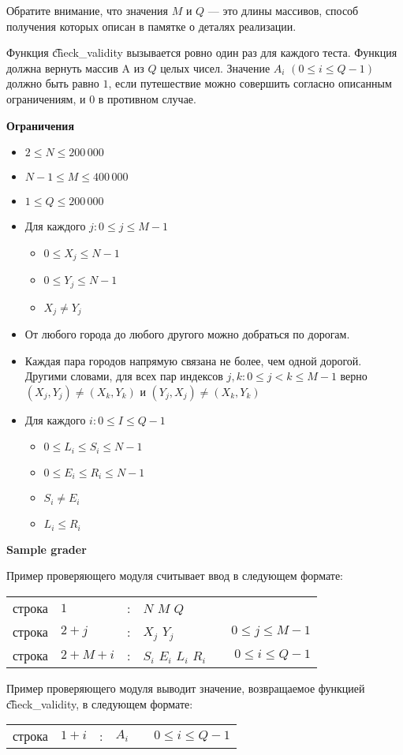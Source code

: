 Обратите внимание, что значения $M$ и $Q$ --- это длины массивов, способ получения которых описан в памятке о деталях реализации.

Функция \t{check_validity} вызывается ровно один раз для каждого теста. Функция должна вернуть массив A из $Q$ целых чисел. Значение $A_i$ $(0 \le i \le Q-1)$ должно быть равно $1$, если путешествие можно совершить согласно описанным ограничениям, и $0$ в противном случае.


\bf{Ограничения}

\begin{itemize}
\item $2 \le N \le 200\,000$
\item $N-1 \le M \le 400\,000$
\item $1 \le Q \le 200\,000$
\item Для каждого $j : 0 \le j \le M-1$
\begin{itemize}
\item $0 \le X_j \le N-1$
\item $0 \le Y_j \le N-1$
\item $X_j \neq Y_j$
\end{itemize}
\item От любого города до любого другого можно добраться по дорогам.
\item Каждая пара городов напрямую связана не более, чем одной дорогой. Другими словами, для всех пар индексов $j, k: 0 \le j < k \le M-1$ верно $(X_j, Y_j) \neq (X_k, Y_k)$ и $(Y_j, X_j) \neq (X_k, Y_k)$
\item Для каждого $i: 0 \le I \le Q-1$
\begin{itemize}
\item $0 \le L_i \le S_i \le N-1$
\item $0 \le E_i \le R_i \le N-1$
\item $S_i \neq E_i$
\item $L_i \le R_i$
\end{itemize}
\end{itemize}


\bf{Sample grader}

Пример проверяющего модуля считывает ввод в следующем формате:

\begin{tabular}{clclcr}
строка&$1$&:&$N$ $M$ $Q$&&\\
строка&$2+j$&:&$X_j$ $Y_j$&&$0 \le j \le M-1$\\
строка&$2+M+i$&:&$S_i$ $E_i$ $L_i$ $R_i$ &&$0 \le i \le Q-1$\\
\end{tabular}

Пример проверяющего модуля выводит значение, возвращаемое функцией \t{check_validity}, в следующем формате:

\begin{tabular}{clclcr}
строка&$1+i$&:&$A_i$&&$0 \le i \le Q-1$
\end{tabular}
